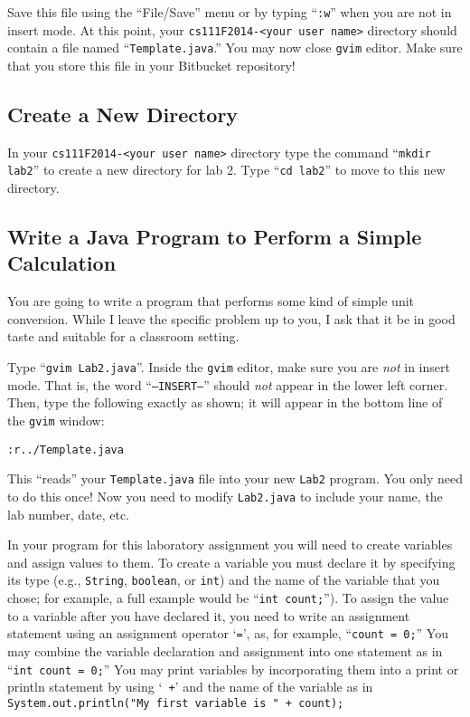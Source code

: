 \noindent Save this file using the ``File/Save'' menu or by typing ``{\tt :w}'' when you are not in insert mode. At this
point, your {\tt cs111F2014-<your user name>} directory should contain a file named ``{\tt Template.java}.'' You may now
close {\tt gvim} editor. Make sure that you store this file in your Bitbucket repository!

\subsection*{Create a New Directory}

In your {\tt cs111F2014-<your user name>} directory type the command ``{\tt mkdir lab2}'' to create a new directory for lab 2.
\noindent Type ``{\tt cd lab2}'' to move to this new directory.  

\subsection*{Write a Java Program to Perform a Simple Calculation}

You are going to write a program that performs some kind of simple unit conversion. While I leave the specific problem
up to you, I ask that it be in good taste and suitable for a classroom setting.

 Type ``{\tt gvim Lab2.java}''. Inside the {\tt gvim} editor, make sure you are {\em
not} in insert mode. That is, the word ``{\tt --INSERT--}'' should {\em not} appear in the lower left corner. Then, type
the following exactly as shown; it will appear in the bottom line of the {\tt gvim} window: 

\begin{center} \verb$:r../Template.java$ \end{center} 

This ``reads'' your {\tt Template.java} file into your new {\tt Lab2} program.  You only need to do this once!  Now you
need to modify {\tt Lab2.java} to include your name, the lab number, date, etc.

In your program for this laboratory assignment you will need to create variables and assign values to them. To create a
variable you must declare it by specifying its type (e.g., {\tt String}, {\tt boolean}, or {\tt int}) and the name of
the variable that you chose; for example, a full example would be ``{\tt int count;}'').  To assign the value to a
variable after you have declared it, you need to write an assignment statement using an assignment operator `{\tt =}',
as, for example, ``{\tt count = 0;}'' You may combine the variable declaration and assignment into one statement as in
``{\tt int count = 0;}'' You may print variables by incorporating them into a print or println statement by using `{\tt
+}' and the name of the variable as in {\tt System.out.println("My first variable is " + count);} 

